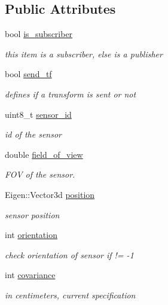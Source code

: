 \subsection*{Public Attributes}
\begin{DoxyCompactItemize}
\item 
bool \mbox{\hyperlink{group__plugin_ga51a4de10631a84721596038771ef77ea}{is\+\_\+subscriber}}
\begin{DoxyCompactList}\small\item\em this item is a subscriber, else is a publisher \end{DoxyCompactList}\item 
bool \mbox{\hyperlink{group__plugin_ga3488a32205974b427d937ca524aa3aa0}{send\+\_\+tf}}
\begin{DoxyCompactList}\small\item\em defines if a transform is sent or not \end{DoxyCompactList}\item 
uint8\+\_\+t \mbox{\hyperlink{group__plugin_gaeac19ed23b46f4e7a3cf3c02ed28da28}{sensor\+\_\+id}}
\begin{DoxyCompactList}\small\item\em id of the sensor \end{DoxyCompactList}\item 
double \mbox{\hyperlink{group__plugin_ga347b13757e45e5125842a118c43ef74a}{field\+\_\+of\+\_\+view}}
\begin{DoxyCompactList}\small\item\em F\+OV of the sensor. \end{DoxyCompactList}\item 
Eigen\+::\+Vector3d \mbox{\hyperlink{group__plugin_ga0d2d16da9abd307183e28dca358cc82d}{position}}
\begin{DoxyCompactList}\small\item\em sensor position \end{DoxyCompactList}\item 
int \mbox{\hyperlink{group__plugin_ga43f807eab20df3eafb28caf582e4b77b}{orientation}}
\begin{DoxyCompactList}\small\item\em check orientation of sensor if != -\/1 \end{DoxyCompactList}\item 
int \mbox{\hyperlink{group__plugin_ga9795eedbcdd190f5131ceee05829bea1}{covariance}}
\begin{DoxyCompactList}\small\item\em in centimeters, current specification \end{DoxyCompactList}\item 

\end{DoxyCompactItemize}
